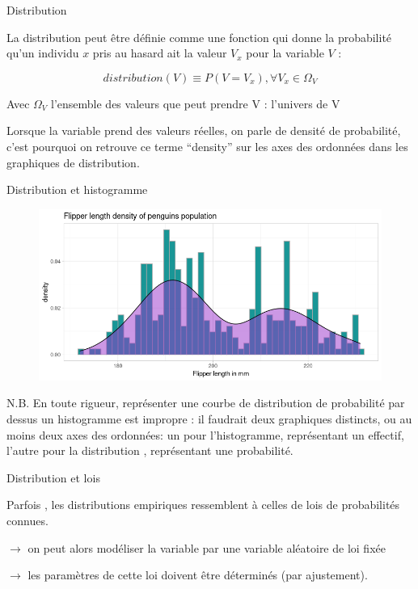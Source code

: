 \documentclass{beamer}
\begin{document}
\begin{frame}{Distribution}





La distribution peut être définie comme une \alert{fonction} qui donne la probabilité qu’un individu $x$ pris au hasard  ait la valeur $V_x$ pour la variable $V$ : 

$$distribution(V) \equiv P(V=V_x),\forall V_x \in \Omega_V$$ 

Avec $\Omega_V$  l’ensemble des valeurs que peut prendre V : l’univers de V

Lorsque la variable prend des valeurs réelles, on parle de \alert{densité de probabilité}, c’est pourquoi on retrouve ce terme “density” sur les axes des ordonnées dans les graphiques de distribution.


\end{frame}

\begin{frame}{Distribution et histogramme}

\begin{figure}
  \centering
     \includegraphics[width=.7\linewidth]{img/histo_dens.png}
\end{figure}

\begin{scriptsize}
\begin{spacing}{0.75}
\alert{N.B.} En toute rigueur, représenter une courbe de distribution de probabilité par dessus un histogramme est impropre : il faudrait deux graphiques distincts, ou au moins deux axes des ordonnées: un pour l’histogramme, représentant un effectif, l’autre pour la distribution , représentant une probabilité.
\end{spacing}
\end{scriptsize}

\end{frame}





\begin{frame}{Distribution et lois}

Parfois , les distributions empiriques ressemblent à celles de lois de probabilités connues. 

$\rightarrow$ on peut alors  \alert{modéliser}  la  variable par une variable aléatoire de loi fixée

$\rightarrow$ les paramètres de cette loi doivent être déterminés (par \alert{ajustement}).


\end{frame}
\end{document}

